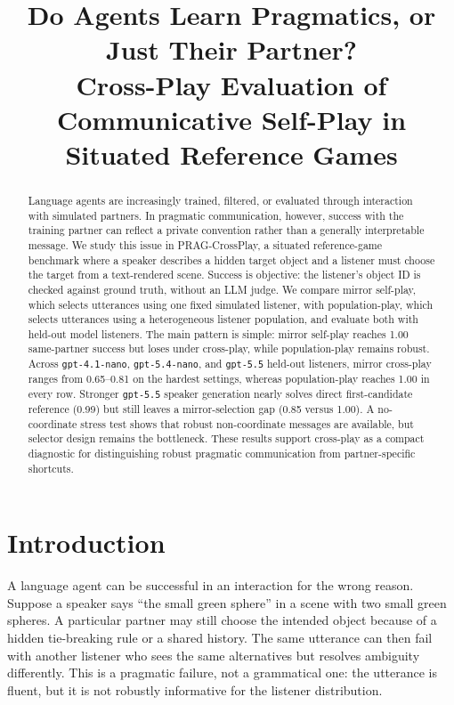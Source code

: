\documentclass{article}
\title{Do Agents Learn Pragmatics, or Just Their Partner?\\
\large Cross-Play Evaluation of Communicative Self-Play in Situated Reference Games}
\author{}
\date{}
\begin{document}
\ifcolmsubmission
\linenumbers
\fi
\maketitle

\begin{abstract}
Language agents are increasingly trained, filtered, or evaluated through interaction with simulated partners. In pragmatic communication, however, success with the training partner can reflect a private convention rather than a generally interpretable message. We study this issue in PRAG-CrossPlay, a situated reference-game benchmark where a speaker describes a hidden target object and a listener must choose the target from a text-rendered scene. Success is objective: the listener's object ID is checked against ground truth, without an LLM judge. We compare mirror self-play, which selects utterances using one fixed simulated listener, with population-play, which selects utterances using a heterogeneous listener population, and evaluate both with held-out model listeners. The main pattern is simple: mirror self-play reaches 1.00 same-partner success but loses under cross-play, while population-play remains robust. Across \texttt{gpt-4.1-nano}, \texttt{gpt-5.4-nano}, and \texttt{gpt-5.5} held-out listeners, mirror cross-play ranges from 0.65--0.81 on the hardest settings, whereas population-play reaches 1.00 in every row. Stronger \texttt{gpt-5.5} speaker generation nearly solves direct first-candidate reference (0.99) but still leaves a mirror-selection gap (0.85 versus 1.00). A no-coordinate stress test shows that robust non-coordinate messages are available, but selector design remains the bottleneck. These results support cross-play as a compact diagnostic for distinguishing robust pragmatic communication from partner-specific shortcuts.
\end{abstract}

\section{Introduction}

A language agent can be successful in an interaction for the wrong reason. Suppose a speaker says ``the small green sphere'' in a scene with two small green spheres. A particular partner may still choose the intended object because of a hidden tie-breaking rule or a shared history. The same utterance can then fail with another listener who sees the same alternatives but resolves ambiguity differently. This is a pragmatic failure, not a grammatical one: the utterance is fluent, but it is not robustly informative for the listener distribution.
\end{document}

